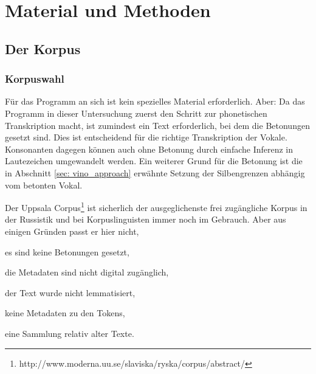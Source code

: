 \documentclass[12pt,headsepline,a4paper]{scrartcl}
\newcommand\textcyr[1]{{\fontencoding{OT2}\fontfamily{wncyr}\selectfont #1}}
\begin{document}
% 

\newpage
\section{Material und Methoden}
\label{sec:mate_meth}

\subsection{Der Korpus}
\label{sec:corpus_pars}

\subsubsection{Korpuswahl}
Für das Programm an sich ist kein spezielles Material erforderlich. Aber: Da das Programm in dieser Untersuchung zuerst den Schritt zur phonetischen Transkription macht, ist zumindest ein Text erforderlich, bei dem die Betonungen gesetzt sind. Dies ist entscheidend für die richtige Transkription der Vokale. Konsonanten dagegen können auch ohne Betonung durch einfache Inferenz in Lautezeichen umgewandelt werden. Ein weiterer Grund für die Betonung ist die in Abschnitt \ref{sec: vino_approach} erwähnte Setzung der Silbengrenzen abhängig vom betonten Vokal.

Der Uppsala Corpus\footnote{http://www.moderna.uu.se/slaviska/ryska/corpus/abstract/} ist sicherlich der ausgeglichenste frei zugängliche Korpus in der Russistik und bei Korpuslinguisten immer noch im Gebrauch. Aber aus einigen Gründen passt er hier nicht,
\begin{inparaenum}[(1)]
\item es sind keine Betonungen gesetzt,
\item die Metadaten sind nicht digital zugänglich,
\item der Text wurde nicht lemmatisiert,
\item keine Metadaten zu den Tokens,
\item eine Sammlung relativ alter Texte.
\end{inparaenum} 
\end{document}
